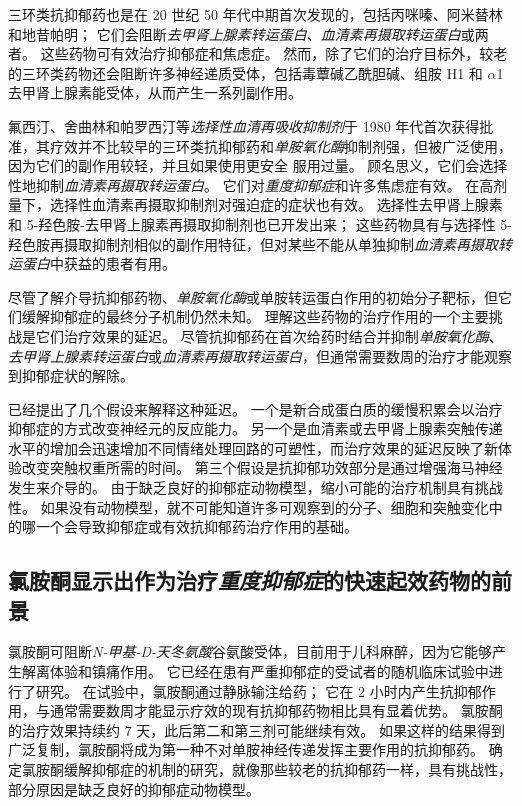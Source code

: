 三环类抗抑郁药也是在 20 世纪 50 年代中期首次发现的，包括丙咪嗪、阿米替林和地昔帕明；
它们会阻断\textit{去甲肾上腺素转运蛋白}、\textit{血清素再摄取转运蛋白}或两者。
这些药物可有效治疗抑郁症和焦虑症。
然而，除了它们的治疗目标外，较老的三环类药物还会阻断许多神经递质受体，包括毒蕈碱乙酰胆碱、组胺 H1 和 $\alpha$1 去甲肾上腺素能受体，从而产生一系列副作用。


氟西汀、舍曲林和帕罗西汀等\textit{选择性血清再吸收抑制剂}于 1980 年代首次获得批准，其疗效并不比较早的三环类抗抑郁药和\textit{单胺氧化酶}抑制剂强，但被广泛使用，因为它们的副作用较轻，并且如果使用更安全 服用过量。
顾名思义，它们会选择性地抑制\textit{血清素再摄取转运蛋白}。
它们对\textit{重度抑郁症}和许多焦虑症有效。
在高剂量下，选择性血清素再摄取抑制剂对强迫症的症状也有效。
选择性去甲肾上腺素和 5-羟色胺-去甲肾上腺素再摄取抑制剂也已开发出来；
这些药物具有与选择性 5-羟色胺再摄取抑制剂相似的副作用特征，但对某些不能从单独抑制\textit{血清素再摄取转运蛋白}中获益的患者有用。


尽管了解介导抗抑郁药物、\textit{单胺氧化酶}或单胺转运蛋白作用的初始分子靶标，但它们缓解抑郁症的最终分子机制仍然未知。
理解这些药物的治疗作用的一个主要挑战是它们治疗效果的延迟。
尽管抗抑郁药在首次给药时结合并抑制\textit{单胺氧化酶}、\textit{去甲肾上腺素转运蛋白}或\textit{血清素再摄取转运蛋白}，但通常需要数周的治疗才能观察到抑郁症状的解除。


已经提出了几个假设来解释这种延迟。
一个是新合成蛋白质的缓慢积累会以治疗抑郁症的方式改变神经元的反应能力。
另一个是血清素或去甲肾上腺素突触传递水平的增加会迅速增加不同情绪处理回路的可塑性，而治疗效果的延迟反映了新体验改变突触权重所需的时间。
第三个假设是抗抑郁功效部分是通过增强海马神经发生来介导的。
由于缺乏良好的抑郁症动物模型，缩小可能的治疗机制具有挑战性。
如果没有动物模型，就不可能知道许多可观察到的分子、细胞和突触变化中的哪一个会导致抑郁症或有效抗抑郁药治疗作用的基础。



\subsection{氯胺酮显示出作为治疗\textit{重度抑郁症}的快速起效药物的前景}

氯胺酮可阻断\textit{N-甲基-D-天冬氨酸}谷氨酸受体，目前用于儿科麻醉，因为它能够产生解离体验和镇痛作用。
它已经在患有严重抑郁症的受试者的随机临床试验中进行了研究。
在试验中，氯胺酮通过静脉输注给药；
它在 2 小时内产生抗抑郁作用，与通常需要数周才能显示疗效的现有抗抑郁药物相比具有显着优势。
氯胺酮的治疗效果持续约 7 天，此后第二和第三剂可能继续有效。
如果这样的结果得到广泛复制，氯胺酮将成为第一种不对单胺神经传递发挥主要作用的抗抑郁药。
确定氯胺酮缓解抑郁症的机制的研究，就像那些较老的抗抑郁药一样，具有挑战性，部分原因是缺乏良好的抑郁症动物模型。


